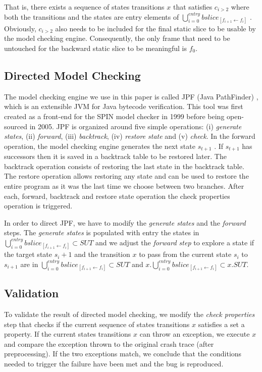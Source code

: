 \documentclass[times]{smrauth}
\begin{document}
That is, there exists a sequence of states transitions $x$ that
satisfies $c_{i>2}$ where both the transitions and the states are
entry
elements of $\bigcup_{i=0}^{entry} bslice_{[f_{i+1} \leftarrow f_i]}$ . Obviously, $c_{i>2}$ also
needs to be included for the final static slice to be usable by
the model checking engine. Consequently, the only frame that
need to be untouched for the backward static slice to be
meaningful is $f_0$.

\subsection{Directed Model Checking}

The model checking engine we use in this paper is called JPF
(Java PathFinder) \cite{Visser2004}, which is an extensible JVM for Java
bytecode verification. This tool was first created as a front-end
for the SPIN model checker \cite{holzmann1997model} in 1999 before being open-
sourced in 2005. JPF is organized around five simple
operations: (i) {\it generate states}, (ii) {\it forward}, (iii) {\it backtrack},
(iv) {\it restore state} and (v) {\it check}. In the forward operation, the
model checking engine generates the next state $s_{t+1}$ . If
$s_{t+1}$ has successors then it is saved in a backtrack table to be
restored later. The backtrack operation consists of restoring
the last state in the backtrack table. The restore operation
allows restoring any state and can be used to restore the entire
program as it was the last time we choose between two
branches. After each, forward, backtrack and restore state
operation the check properties operation is triggered.

In order to direct JPF, we have to modify the {\it generate states}
and the {\it forward} steps. The {\it generate states} is populated with
entry
the states in $\bigcup_{i=0}^{entry} bslice_{[f_{i+1} \leftarrow f_i]}  \subset SUT$ and we adjust the
{\it forward step} to explore a state if the target state $s_i+1$ and the
transition $x$ to pass from the current state $s_i$ to $s_{i+1}$ are in
$\bigcup_{i=0}^{entry} bslice_{[f_{i+1} \leftarrow f_i]}  \subset SUT$ and $x.\bigcup_{i=0}^{entry} bslice_{[f_{i+1} \leftarrow f_i]}  \subset x.SUT$.

\subsection{Validation}

To validate the result of directed model checking, we modify
the {\it check properties} step that checks if the current sequence
of states transitions $x$ satisfies a set a property. If the current
states transitions $x$ can throw an exception, we execute $x$ and
compare the exception thrown to the original crash trace (after
preprocessing). If the two exceptions match, we conclude that
the conditions needed to trigger the failure have been met and
the bug is reproduced.
\end{document}
